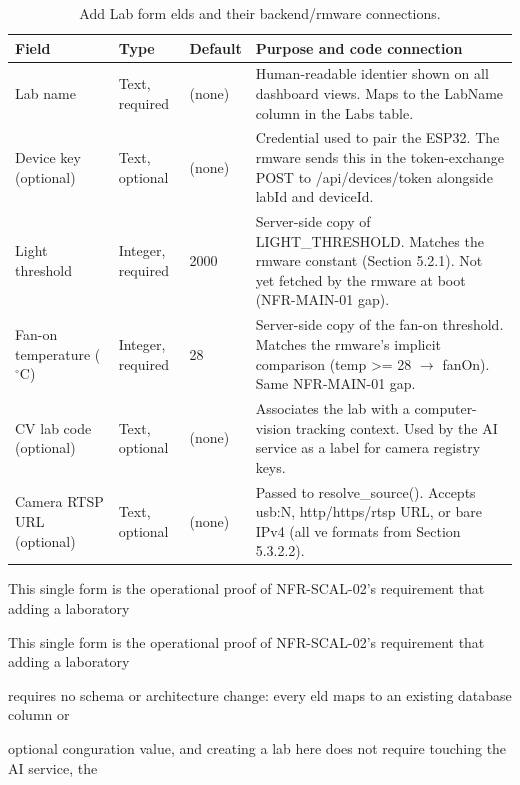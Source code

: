 \begin{table}[htbp]
	\centering
	\caption{Add Lab form elds and their backend/rmware connections.}
	\label{tab:5-4}
	\begin{tabular}{llll}
		\toprule
		Field                          & Type              & Default & Purpose and code connection                                                                                                                 \\
		\midrule
		Lab name                       & Text, required    & (none)  & Human-readable identier shown on all dashboard views. Maps to the LabName column in the Labs table.                                         \\
		Device key (optional)          & Text, optional    & (none)  & Credential used to pair the ESP32. The rmware sends this in the token-exchange POST to /api/devices/token alongside labId and deviceId.     \\
		Light threshold                & Integer, required & 2000    & Server-side copy of LIGHT\_THRESHOLD. Matches the rmware constant (Section 5.2.1). Not yet fetched by the rmware at boot (NFR-MAIN-01 gap). \\
		Fan-on temperature ($^\circ$C) & Integer, required & 28      & Server-side copy of the fan-on threshold. Matches the rmware's implicit comparison (temp >= 28 $\rightarrow$ fanOn). Same NFR-MAIN-01 gap.  \\
		CV lab code (optional)         & Text, optional    & (none)  & Associates the lab with a computer-vision tracking context. Used by the AI service as a label for camera registry keys.                     \\
		Camera RTSP URL (optional)     & Text, optional    & (none)  & Passed to resolve\_source(). Accepts usb:N, http/https/rtsp URL, or bare IPv4 (all ve formats from Section 5.3.2.2).                        \\
		\bottomrule
	\end{tabular}
\end{table}

This single form is the operational proof of NFR-SCAL-02's requirement that adding a laboratory

This single form is the operational proof of NFR-SCAL-02's requirement that adding a laboratory

requires no schema or architecture change: every eld maps to an existing database column or

optional conguration value, and creating a lab here does not require touching the AI service, the

